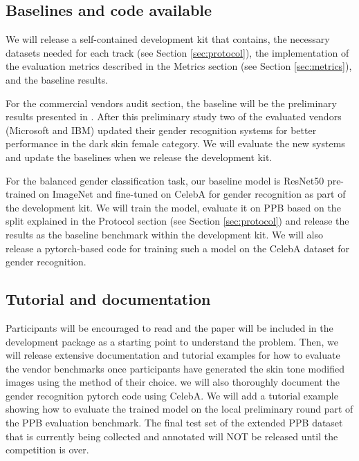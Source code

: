 \documentclass[11pt, oneside]{article}
\makeatletter
\let\@internalcite\cite
\def\cite{\def\citeauthoryear##1##2{##1, ##2}\@internalcite}
\makeatother
\begin{document}
\subsection{Baselines and code available}

We will release a self-contained development kit that contains, the necessary datasets needed for each track (see Section \ref{sec:protocol}), the implementation of the evaluation metrics described in the Metrics section (see Section \ref{sec:metrics}), and the baseline results.

For the commercial vendors audit section, the baseline will be the preliminary results presented in \cite{buolamwini2018gender}. After this preliminary study two of the evaluated vendors (Microsoft and IBM) updated their gender recognition systems for better performance in the dark skin female category. We will evaluate the new systems and update the baselines when we release the development kit.

For the balanced gender classification task, our baseline model is ResNet50 pre-trained on ImageNet and fine-tuned on CelebA for gender recognition as part of the development kit. We will train the model, evaluate it on PPB based on the split explained in the Protocol section (see Section \ref{sec:protocol}) and release the results as the baseline benchmark within the development kit. We will also release a pytorch-based code for training such a model on the CelebA dataset for gender recognition.

\subsection{Tutorial and documentation}

Participants will be encouraged to read \cite{buolamwini2018gender} and the paper will be included in the development package as a starting point to understand the problem. Then, we will release extensive documentation and tutorial examples for how to evaluate the vendor benchmarks once participants have generated the skin tone modified images using the method of their choice. we will also thoroughly document the gender recognition pytorch code using CelebA. We will add a tutorial example showing how to evaluate the trained model on the local preliminary round part of the PPB evaluation benchmark. The final test set of the extended PPB dataset that is currently being collected and annotated will NOT be released until the competition is over.
\end{document}
